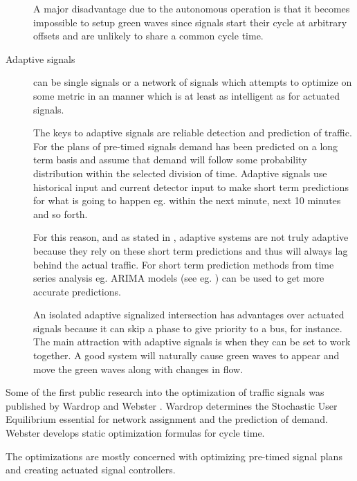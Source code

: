 \begin{description}
A major disadvantage due to the autonomous operation is that it becomes impossible to setup green waves since signals start their cycle at arbitrary offsets and are unlikely to share a common cycle time.

\item[Adaptive signals] can be single signals or a network of signals which attempts to optimize on some metric in an manner which is at least as intelligent as for actuated signals. 

The keys to adaptive signals are reliable detection and prediction of traffic. For the plans of pre-timed signals demand has been predicted on a long term basis and assume that demand will follow some probability distribution within the selected division of time. Adaptive signals use historical input and current detector input to make short term predictions for what is going to happen eg. within the next minute, next 10 minutes and so forth. 

For this reason, and as stated in \cite{1}, adaptive systems are not truly adaptive because they rely on these short term predictions and thus will always lag behind the actual traffic. For short term prediction methods from time series analysis eg. ARIMA models (see eg. \cite{shortpredict}) can be used to get more accurate predictions.

An isolated adaptive signalized intersection has advantages over actuated signals because it can skip a phase to give priority to a bus, for instance. The main attraction with adaptive signals is when they can be set to work together. A good system will naturally cause green waves to appear and move the green waves along with changes in flow.
\end{description}

Some of the first public research into the optimization of traffic signals was published by Wardrop \cite{Wardrop} and Webster \cite{Webster}. Wardrop determines the Stochastic User Equilibrium essential for network assignment and the prediction of demand. Webster develops static optimization formulas for cycle time.

The optimizations are mostly concerned with optimizing pre-timed signal plans and creating actuated signal controllers.